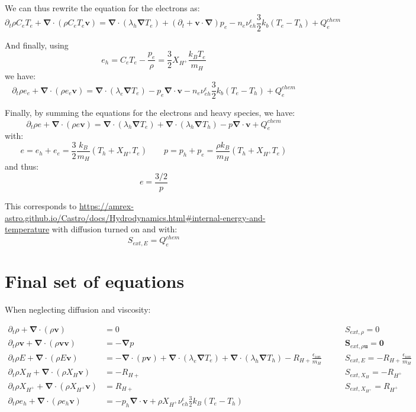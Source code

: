 \documentclass[11pt, oneside]{article}   	%
\begin{document}
We can thus rewrite the equation for the electrons as:
\[ \partial_t \rho C_e T_e + \boldsymbol{\nabla}\cdot(\rho C_e T_e \boldsymbol{v}) = \boldsymbol{\nabla}\cdot(\lambda_h\boldsymbol{\nabla}T_e) + (\partial_t + \boldsymbol{v}\cdot\boldsymbol{\nabla})p_e - n_e\nu_{eh}^\epsilon \frac{3}{2}k_b(T_e - T_h) + Q_e^{chem} \]

And finally, using
\[ e_h = C_e T_e - \frac{p_e}{\rho} = \frac{3}{2}X_{H^+}\frac{k_B T_e}{m_H} \]
we have:
\[ \partial_t \rho e_e + \boldsymbol{\nabla}\cdot(\rho e_e \boldsymbol{v}) = \boldsymbol{\nabla}\cdot(\lambda_e\boldsymbol{\nabla}T_e) - p_e\boldsymbol{\nabla}\cdot\boldsymbol{v} - n_e\nu_{eh}^\epsilon \frac{3}{2}k_b(T_e - T_h) + Q_e^{chem} \]

Finally, by summing the equations for the electrons and heavy species, we have:
\begin{equation}  
\partial_t \rho e + \boldsymbol{\nabla}\cdot(\rho e \boldsymbol{v}) = \boldsymbol{\nabla}\cdot(\lambda_h\boldsymbol{\nabla}T_e) + \boldsymbol{\nabla}\cdot(\lambda_h\boldsymbol{\nabla}T_h) - p\boldsymbol{\nabla}\cdot\boldsymbol{v} + Q_e^{chem} \label{eq:internal_energy}
\end{equation}
with:
\[ e = e_h + e_e =  \frac{3}{2}\frac{k_B}{m_H}(T_h + X_{H^+}T_e) \qquad p = p_h + p_e = \frac{\rho k_B}{m_H}(T_h + X_{H^+}T_e) \]
and thus:
\[ e = \frac{3/2} p \]

This corresponds to \url{https://amrex-astro.github.io/Castro/docs/Hydrodynamics.html#internal-energy-and-temperature} with diffusion turned on and with:
\[ S_{ext, E} = Q_e^{chem} \]

\section{Final set of equations}

When neglecting diffusion and viscosity:

\begin{align}
\partial_t \rho + \boldsymbol{\nabla}\cdot( \rho\boldsymbol{v} ) &= 0 &\qquad S_{ext,\rho} = 0 \\
\partial_t \rho \boldsymbol{v} + \boldsymbol{\nabla}\cdot(\rho \boldsymbol{v} \boldsymbol{v}) &= -\boldsymbol{\nabla}p &\qquad \boldsymbol{S}_{ext,\rho\boldsymbol{u}} = \boldsymbol{0} \\
 \partial_t \rho E + \boldsymbol{\nabla}\cdot(\rho E \boldsymbol{v}) &= - \boldsymbol{\nabla}\cdot (p\boldsymbol{v}) + \boldsymbol{\nabla}\cdot(\lambda_e\boldsymbol{\nabla}T_e) + \boldsymbol{\nabla}\cdot(\lambda_h\boldsymbol{\nabla}T_h)-R_{H+} \frac{\epsilon_{ion}}{m_H}& \qquad S_{ext, E} = -R_{H+} \frac{\epsilon_{ion}}{m_H} \\
 \partial_t \rho X_H + \boldsymbol{\nabla}\cdot( \rho X_H \boldsymbol{v} ) &= -R_{H+} & \qquad S_{ext, X_H} = - R_{H^+}\\
 \partial_t \rho X_{H^+} + \boldsymbol{\nabla}\cdot( \rho X_{H^+} \boldsymbol{v} ) &= R_{H+} & \qquad S_{ext, X_{H^+}} = R_{H^+}\\
  \partial_t \rho e_h + \boldsymbol{\nabla}\cdot(\rho e_h \boldsymbol{v}) &= - p_h \boldsymbol{\nabla}\cdot \boldsymbol{v} + \rho X_{H^+}\nu_{eh}^\epsilon \frac{3}{2}k_B(T_e - T_h) \label{eq:eh}
\end{align}
\end{document}
